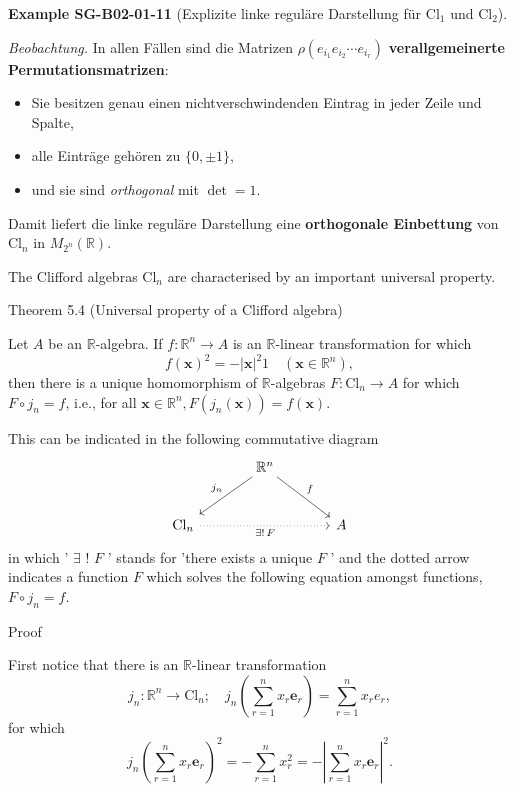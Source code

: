 \documentclass[10pt, letterpaper]{article}
\newcommand{\CustomHeading}[3]{%
  \par\medskip\noindent%
  \textbf{#1 #2} \textnormal{(#3)}.\enskip%
}
\newenvironment{EXA}[2]{\begin{unitbox}\CustomHeading{Example}{#1}{#2}}{\end{unitbox}}
\begin{document}
\begin{EXA}{SG-B02-01-11}{Explizite linke reguläre Darstellung für $\mathrm{Cl}_1$ und $\mathrm{Cl}_2$}
\emph{Beobachtung.}
In allen Fällen sind die Matrizen $\rho(e_{i_1} e_{i_2} \cdots e_{i_r})$ \textbf{verallgemeinerte Permutationsmatrizen}:
\begin{itemize}
  \item Sie besitzen genau einen nichtverschwindenden Eintrag in jeder Zeile und Spalte,
  \item alle Einträge gehören zu $\{0, \pm 1\}$,
  \item und sie sind \emph{orthogonal} mit $\det = 1$.
\end{itemize}
Damit liefert die linke reguläre Darstellung eine \textbf{orthogonale Einbettung} von $\mathrm{Cl}_n$ in $M_{2^n}(\mathbb{R})$.
\end{EXA}



The Clifford algebras $\mathrm{Cl}_{n}$ are characterised by an important universal property. 



Theorem 5.4 (Universal property of a Clifford algebra)


Let $A$ be an $\mathbb{R}$-algebra. If $f: \mathbb{R}^{n} \longrightarrow A$ is an $\mathbb{R}$-linear transformation for which
$$
f(\mathbf{x})^{2}=-|\mathbf{x}|^{2} 1 \quad\left(\mathbf{x} \in \mathbb{R}^{n}\right),
$$
then there is a unique homomorphism of $\mathbb{R}$-algebras $F: \mathrm{Cl}_{n} \longrightarrow A$ for which $F \circ j_{n}=f$, i.e., for all $\mathbf{x} \in \mathbb{R}^{n}, F\left(j_{n}(\mathbf{x})\right)=f(\mathbf{x})$.

This can be indicated in the following commutative diagram
\[
\begin{tikzcd}[row sep=large, column sep=large]
& \mathbb{R}^n \arrow[dl, "j_n"'] \arrow[dr, "f"] & \\
\mathrm{Cl}_n \arrow[rr, dotted, "{\exists!\,F}"'] & & A
\end{tikzcd}
\]
in which ' $\exists$ ! $F$ ' stands for 'there exists a unique $F$ ' and the dotted arrow indicates a function $F$ which solves the following equation amongst functions, $F \circ j_{n}=f$.


Proof

First notice that there is an $\mathbb{R}$-linear transformation
$$
j_{n}: \mathbb{R}^{n} \longrightarrow \mathrm{Cl}_{n} ; \quad j_{n}\left(\sum_{r=1}^{n} x_{r} \mathbf{e}_{r}\right)=\sum_{r=1}^{n} x_{r} e_{r},
$$
for which
$$
j_{n}\left(\sum_{r=1}^{n} x_{r} \mathbf{e}_{r}\right)^{2}=-\sum_{r=1}^{n} x_{r}^{2}=-\left|\sum_{r=1}^{n} x_{r} \mathbf{e}_{r}\right|^{2} .
$$
\end{document}
